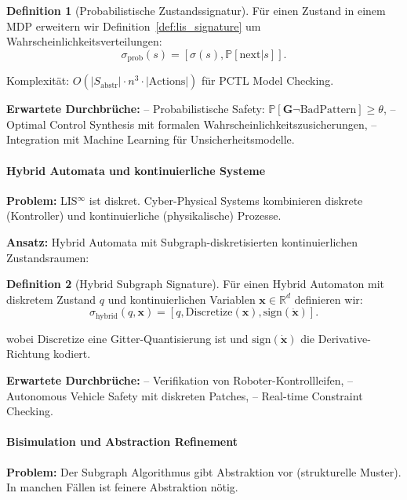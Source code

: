 \documentclass[a4paper,12pt]{article}
\theoremstyle{definition}
\newtheorem{definition}{Definition}
\begin{document}
\begin{definition}[Probabilistische Zustandssignatur]
	Für einen Zustand in einem MDP erweitern wir Definition~\ref{def:lis_signature} um Wahrscheinlichkeitsverteilungen:
	\[
	\sigma_{\text{prob}}(s) = \left[\sigma(s), \mathbb{P}[\text{next} | s]\right].
	\]
\end{definition}

Komplexität: $O(|S_{\text{abstr}}| \cdot n^3 \cdot |\text{Actions}|)$ für PCTL Model Checking.

\textbf{Erwartete Durchbrüche:}
-- Probabilistische Safety: $\mathbb{P}[\mathbf{G}\neg\text{BadPattern}] \geq \theta$,
-- Optimal Control Synthesis mit formalen Wahrscheinlichkeitszusicherungen,
-- Integration mit Machine Learning für Unsicherheitsmodelle.

\paragraph{Hybrid Automata und kontinuierliche Systeme}

\textbf{Problem:} LIS$^{\infty}$ ist diskret. Cyber-Physical Systems kombinieren diskrete (Kontroller) und kontinuierliche (physikalische) Prozesse.

\textbf{Ansatz:} Hybrid Automata mit Subgraph-diskretisierten kontinuierlichen Zustandsraumen:

\begin{definition}[Hybrid Subgraph Signature]
	Für einen Hybrid Automaton mit diskretem Zustand $q$ und kontinuierlichen Variablen $\mathbf{x} \in \mathbb{R}^d$ definieren wir:
	\[
	\sigma_{\text{hybrid}}(q, \mathbf{x}) = [q, \text{Discretize}(\mathbf{x}), \text{sign}(\dot{\mathbf{x}})].
	\]
	
	wobei $\text{Discretize}$ eine Gitter-Quantisierung ist und $\text{sign}(\dot{\mathbf{x}})$ die Derivative-Richtung kodiert.
\end{definition}

\textbf{Erwartete Durchbrüche:}
-- Verifikation von Roboter-Kontrollleifen,
-- Autonomous Vehicle Safety mit diskreten Patches,
-- Real-time Constraint Checking.

\paragraph{Bisimulation und Abstraction Refinement}

\textbf{Problem:} Der Subgraph Algorithmus gibt Abstraktion vor (strukturelle Muster). In manchen Fällen ist feinere Abstraktion nötig.
\end{document}
